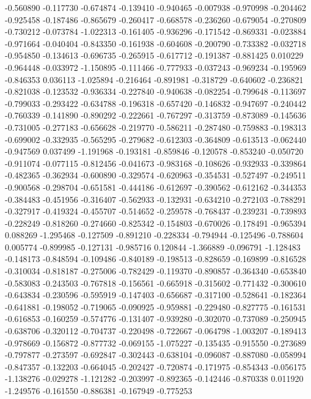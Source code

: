 -0.560890
-0.117730
-0.674874
-0.139410
-0.940465
-0.007938
-0.970998
-0.204462
-0.925458
-0.187486
-0.865679
-0.260417
-0.668578
-0.236260
-0.679054
-0.270809
-0.730212
-0.073784
-1.022313
-0.161405
-0.936296
-0.171542
-0.869331
-0.023884
-0.971664
-0.040404
-0.843350
-0.161938
-0.604608
-0.200790
-0.733382
-0.032718
-0.954850
-0.134613
-0.696735
-0.265915
-0.617712
-0.191387
-0.881425
0.010229
-0.964448
-0.033972
-1.150895
-0.111466
-0.777933
-0.037243
-0.969234
-0.195969
-0.846353
0.036113
-1.025894
-0.216464
-0.891981
-0.318729
-0.640602
-0.236821
-0.821038
-0.123532
-0.936334
-0.227840
-0.940638
-0.082254
-0.799648
-0.113697
-0.799033
-0.293422
-0.634788
-0.196318
-0.657420
-0.146832
-0.947697
-0.240442
-0.760339
-0.141890
-0.890292
-0.222661
-0.767297
-0.313759
-0.873089
-0.145636
-0.731005
-0.277183
-0.656628
-0.219770
-0.586211
-0.287480
-0.759883
-0.198313
-0.699002
-0.332935
-0.565295
-0.279682
-0.612303
-0.364809
-0.613513
-0.062440
-0.947569
0.037499
-1.191968
-0.193181
-0.859846
-0.120578
-0.853240
-0.050720
-0.911074
-0.077115
-0.812456
-0.041673
-0.983168
-0.108626
-0.932933
-0.339864
-0.482365
-0.362934
-0.600890
-0.329574
-0.620963
-0.354531
-0.527497
-0.249511
-0.900568
-0.298704
-0.651581
-0.444186
-0.612697
-0.390562
-0.612162
-0.344353
-0.384483
-0.451956
-0.316407
-0.562933
-0.132931
-0.634210
-0.272103
-0.788291
-0.327917
-0.419324
-0.455707
-0.514652
-0.259578
-0.768437
-0.239231
-0.739893
-0.228249
-0.818260
-0.274660
-0.825342
-0.154803
-0.670026
-0.178491
-0.965394
0.088269
-1.295468
-0.127509
-0.891210
-0.228334
-0.794944
-0.125496
-0.788604
0.005774
-0.899985
-0.127131
-0.985716
0.120844
-1.366889
-0.096791
-1.128483
-0.148173
-0.848594
-0.109486
-0.840189
-0.198513
-0.828659
-0.169899
-0.816528
-0.310034
-0.818187
-0.275006
-0.782429
-0.119370
-0.890857
-0.364340
-0.653840
-0.583083
-0.243503
-0.767818
-0.156561
-0.665918
-0.315602
-0.771432
-0.300610
-0.643834
-0.230596
-0.595919
-0.147403
-0.656687
-0.317100
-0.528641
-0.182364
-0.641881
-0.198052
-0.719065
-0.090925
-0.959881
-0.229480
-0.827775
-0.161531
-0.616853
-0.160259
-0.574776
-0.131407
-0.939280
-0.302070
-0.737089
-0.250945
-0.638706
-0.320112
-0.704737
-0.220498
-0.722667
-0.064798
-1.003207
-0.189413
-0.978669
-0.156872
-0.877732
-0.069155
-1.075227
-0.135435
-0.915550
-0.273689
-0.797877
-0.273597
-0.692847
-0.302443
-0.638104
-0.096087
-0.887080
-0.058994
-0.847357
-0.132203
-0.664045
-0.202427
-0.720874
-0.171975
-0.854343
-0.056175
-1.138276
-0.029278
-1.121282
-0.203997
-0.892365
-0.142446
-0.870338
0.011920
-1.249576
-0.161550
-0.886381
-0.167949
-0.775253
